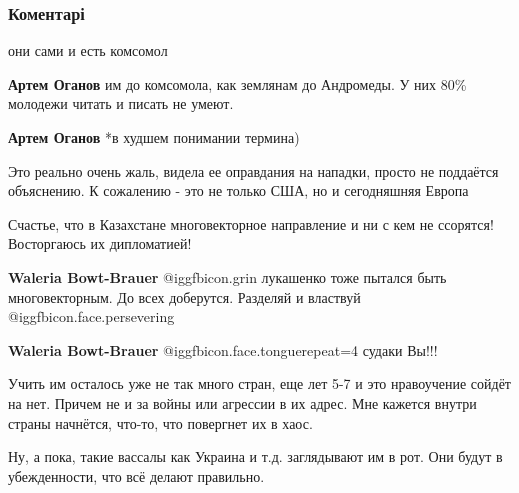  
 
 
 
 
\subsubsection{Коментарі}

\begin{itemize} %
они сами и есть комсомол

\begin{itemize} %
\textbf{Артем Оганов} им до комсомола, как землянам до Андромеды. У них 80\% молодежи читать и писать не умеют.

\textbf{Артем Оганов} *в худшем понимании термина)
\end{itemize} %


Это реально очень жаль, видела ее оправдания на нападки, просто не поддаётся
объяснению. К сожалению - это не только США, но и сегодняшняя
Европа


Счастье, что в Казахстане многовекторное направление и ни с кем не ссорятся!
Восторгаюсь их дипломатией!

\begin{itemize} %
\textbf{Waleria Bowt-Brauer}  @igg{fbicon.grin} лукашенко тоже пытался быть многовекторным. До всех доберутся. Разделяй и властвуй @igg{fbicon.face.persevering} 

\textbf{Waleria Bowt-Brauer}  @igg{fbicon.face.tongue}{repeat=4} судаки Вы!!!
\end{itemize} %


Учить им осталось уже не так много стран, еще лет 5-7 и это нравоучение сойдёт
на нет. Причем не и за войны или агрессии в их адрес. Мне кажется внутри страны
начнётся, что-то, что повергнет их в хаос.

Ну, а пока, такие вассалы как Украина и т.д. заглядывают им в рот. Они будут в
убежденности, что всё делают правильно.


\end{itemize}
